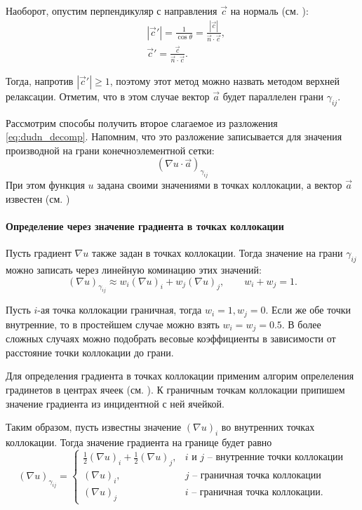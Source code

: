 Наоборот, опустим перпендикуляр с направления $\vec c$ на нормаль (см. ):
\begin{align*}
&|\vec c'| = \frac{1}{\cos\theta} = \frac{|\vec c|}{\vec n \cdot \vec c}, \\
&\vec c' = \frac{\vec c}{\vec n \cdot \vec c}.
\end{align*}

Тогда, напротив $|\vec c'| \geq 1$, поэтому этот метод можно назвать методом верхней релаксации.
Отметим, что в этом случае вектор $\vec a$ будет параллелен грани $\gamma_{ij}$.

\label{sec:fvm_duda}
Рассмотрим способы получить второе слагаемое из разложения \cref{eq:dudn_decomp}.
Напомним, что это разложение записывается для значения производной на грани конечноэлементной сетки:
\begin{equation*}
\left(\nabla u \cdot \vec a\right)_{\gamma_{ij}}
\end{equation*}
При этом функция $u$ задана своими значениями в точках коллокации, а вектор $\vec a$ известен (см. )

\paragraph{Определение через значение градиента в точках коллокации}
Пусть градиент $\nabla u$ также задан в точках коллокации.
Тогда значение на грани $\gamma_{ij}$ 
можно записать через линейную коминацию этих значений:
\begin{equation*}
\left(\nabla u\right)_{\gamma_{ij}} \approx w_i \left(\nabla u\right)_i + w_j \left(\nabla u\right)_j, \qquad w_i + w_j = 1.
\end{equation*}

Пусть $i$-ая точка коллокации граничная, тогда $w_i = 1, w_j = 0$.
Если же обе точки внутренние, то в простейшем случае можно взять $w_i = w_j = 0.5$.
В более сложных случаях можно подобрать весовые коэффициенты в зависимости от расстояние точки коллокации до грани.

Для определения градиента в точках коллокации применим алгорим опрелеления 
градинетов в центрах ячеек (см. ).
К граничным точкам коллокации припишем значение градиента
из инцидентной с ней ячейкой.

Таким образом, пусть известны значение $(\nabla u)_i$ во внутренних точках коллокации. Тогда
значение градиента на границе будет равно
\begin{equation*}
\left(\nabla u\right)_{\gamma_{ij}} =
\begin{cases}
\frac12 \left(\nabla u\right)_i + \frac12 \left(\nabla u\right)_j, & \text{$i$ и $j$ -- внутренние точки коллокации}\\
\left(\nabla u\right)_i, & \text{$j$ -- граничная точка коллокации}\\
\left(\nabla u\right)_j & \text{$i$ -- граничная точка коллокации}.
\end{cases}
\end{equation*}

